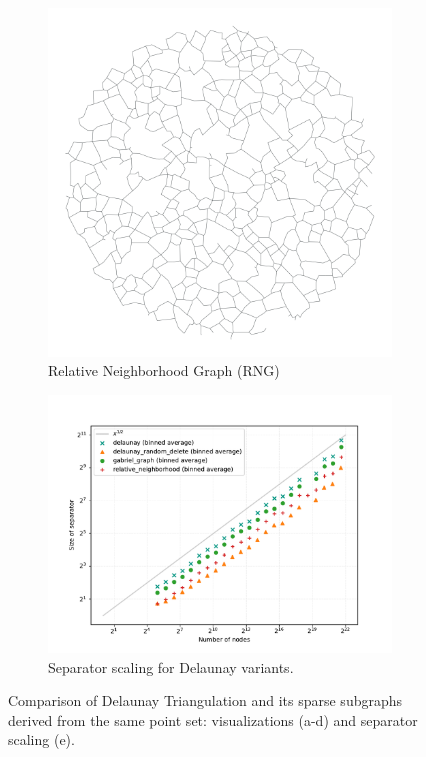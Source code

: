 \begin{figure}[tbhp]
    \begin{subfigure}{0.3\linewidth}
        \centering
        \includegraphics[width=\linewidth]{graphics/relative_neighborhood.png}
        \caption{Relative Neighborhood Graph (RNG)}
        \label{fig:delaunay_rng_viz}
    \end{subfigure}
    \hfill
    \begin{subfigure}{0.6\linewidth} 
        \centering
        \includegraphics[width=\linewidth]{graphics/delaunay_variants_sep.pdf}
        \caption{Separator scaling for Delaunay variants.}
        \label{fig:delaunay_variants_sep_plot}
    \end{subfigure}
    \caption{Comparison of Delaunay Triangulation and its sparse subgraphs derived from the same point set: visualizations (a-d) and separator scaling (e).}
    \label{fig:delaunay_variants_comparison}
\end{figure}

